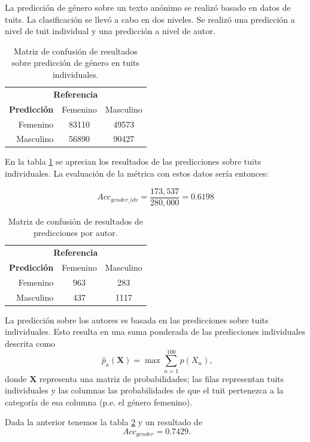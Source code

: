 La predicción de género sobre un texto anónimo se realizó basado en datos de tuits. La clasificación se llevó a cabo en dos niveles. Se realizó una predicción a nivel de tuit individual y una predicción a nivel de autor.

\begin{table}
\centering
\begin{tabular}{r | c c}
\multicolumn{3}{c}{\textbf{Referencia}} \\
\textbf{Predicción} & Femenino & Masculino \\
\hline
Femenino & 83110 & 49573 \\
Masculino & 56890 & 90427 \\
\end{tabular}
\caption{Matriz de confusión de resultados sobre predicción de género en tuits individuales.}
\label{tab:gender_indvtweet}
\end{table}

En la tabla \ref{tab:gender_indvtweet} se aprecian los resultados de las predicciones sobre tuits individuales. La evaluación de la métrica con estos datos sería entonces:

$$ Acc_{gender\_idv} = \frac{173,537}{280,000} = 0\text{.}6198 $$

\begin{table}
\centering
\begin{tabular}{r| c c}
\multicolumn{3}{c}{\textbf{Referencia}} \\
\textbf{Predicción} & Femenino & Masculino \\
\hline
Femenino & 963 & 283 \\
Masculino & 437 & 1117 \\
\end{tabular}
\caption{Matriz de confusión de resultados de predicciones por autor.}
\label{tab:gender_authtweet}
\end{table}

La predicción sobre los autores es basada en las predicciones sobre tuits individuales. Esto resulta en una suma ponderada de las predicciones individuales descrita como
\[ \phantom{,}\hat{p}_a (\mathbf{X}) = \max \sum_{n = 1}^{100} p(X_n), \]
donde $\mathbf{X}$ representa una matriz de probabilidades; las filas representan tuits individuales y las columnas las probabilidades de que el tuit pertenezca a la categoría de esa columna (p.e. el género femenino).

Dada la anterior tenemos la tabla \ref{tab:gender_authtweet} y un resultado de
\[ \phantom{.}Acc_{gender} = 0\text{.}7429. \]

